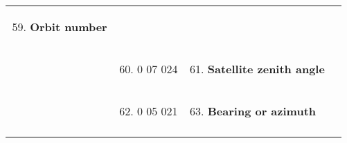 \begin{longtable}[]{@{}llll@{}}
\begin{minipage}[t]{0.22\columnwidth}
\begin{enumerate}
\setcounter{enumi}{58}
\item
  \textbf{Orbit number}
\end{enumerate}\strut
\end{minipage} & \begin{minipage}[t]{0.22\columnwidth}\raggedright
\strut
\end{minipage}\tabularnewline
\begin{minipage}[t]{0.22\columnwidth}\raggedright
\strut
\end{minipage} & \begin{minipage}[t]{0.22\columnwidth}\raggedright
\begin{enumerate}
\setcounter{enumi}{59}
\item
  0 07 024
\end{enumerate}\strut
\end{minipage} & \begin{minipage}[t]{0.22\columnwidth}\raggedright
\begin{enumerate}
\setcounter{enumi}{60}
\item
  \textbf{Satellite zenith angle}
\end{enumerate}\strut
\end{minipage} & \begin{minipage}[t]{0.22\columnwidth}\raggedright
\strut
\end{minipage}\tabularnewline
\begin{minipage}[t]{0.22\columnwidth}\raggedright
\strut
\end{minipage} & \begin{minipage}[t]{0.22\columnwidth}\raggedright
\begin{enumerate}
\setcounter{enumi}{61}
\item
  0 05 021
\end{enumerate}\strut
\end{minipage} & \begin{minipage}[t]{0.22\columnwidth}\raggedright
\begin{enumerate}
\setcounter{enumi}{62}
\item
  \textbf{Bearing or azimuth}
\end{enumerate}\strut
\end{minipage} & \begin{minipage}[t]{0.22\columnwidth}\raggedright
\strut
\end{minipage}\tabularnewline
\begin{minipage}[t]{0.22\columnwidth}\raggedright
\strut

\end{minipage}
\end{longtable}
